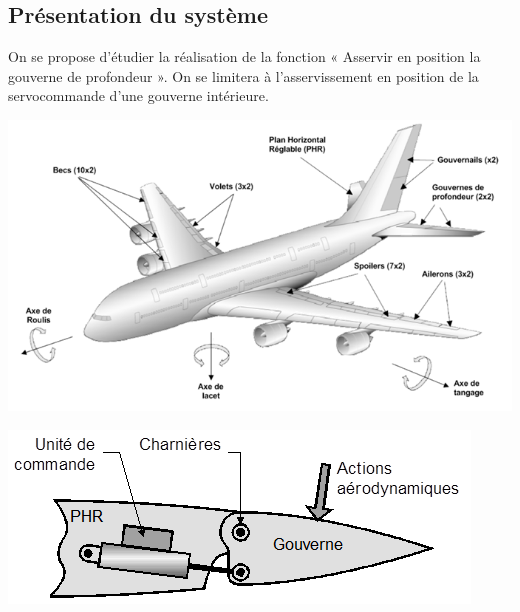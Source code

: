 \documentclass[10pt,fleqn]{article} %
\begin{document}
\def\pathfig{images}

\vspace{4.5cm}
\pagestyle{fancy}
\thispagestyle{plain}

\def\columnseprulecolor{\color{ocre}}
\setlength{\columnseprule}{0.4pt} 

\def\pathfig{images}

\ifprof
\else
\begin{multicols}{2}
\fi


\subsection*{Présentation du système}
\setcounter{subparagraph}{0}

On se propose d’étudier la réalisation de la fonction « Asservir en position la gouverne de profondeur ». On se limitera à l’asservissement en position de la servocommande d’une gouverne intérieure. 

\begin{center}
\includegraphics[width=\linewidth]{images/fig_01}

\includegraphics[width=\linewidth]{images/fig_02}
\end{center}


\end{multicols}
\end{document}
